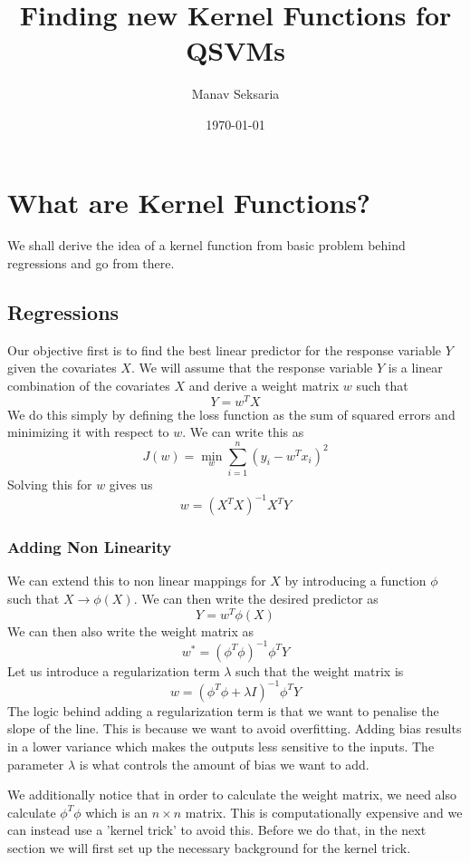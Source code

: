 \documentclass[hidelinks]{book}
\title{Finding new Kernel Functions for QSVMs}
\author{Manav Seksaria}
\date{\today}
\numberwithin{equation}{section}
\begin{document}
\maketitle

\section{What are Kernel Functions?}
We shall derive the idea of a kernel function from basic problem behind regressions and go from there.

\subsection{Regressions}
Our objective first is to find the best linear predictor for the response
variable $Y$ given the covariates $X$. We will assume that the response
variable $Y$ is a linear combination of the covariates $X$ and derive a
weight matrix $w$ such that
$$ Y = w^T X $$ We do this simply by defining the loss function as the sum of
squared errors and minimizing it with respect to $w$. We can write this as
$$ J(w) = \min_w \sum_{i=1}^n (y_i - w^T x_i)^2 $$ Solving this for $w$
gives us
$$ w = (X^T X)^{-1} X^T Y $$

\subsubsection{Adding Non Linearity}
We can extend this to non linear mappings for $X$ by introducing a function $\phi$ such that $X \rightarrow \phi(X)$. We can then write the desired predictor as
$$ Y = w^T \phi(X) $$ We can then also write the weight matrix as
$$ w^* = (\phi^T \phi)^{-1} \phi^T Y $$ Let us introduce a regularization term $\lambda$ such that the weight matrix is
$$ w = (\phi^T \phi + \lambda I)^{-1} \phi^T Y $$ The logic behind adding a regularization term is that we want to penalise the slope of the line. This is because we want to avoid overfitting. Adding bias results in a lower variance which makes the outputs less sensitive to the inputs. The parameter $\lambda$ is what controls the amount of bias we want to add.

We additionally notice that in order to calculate the weight matrix, we need also calculate $\phi^T \phi$ which is an $n \times n$ matrix. This is computationally expensive and we can instead use a 'kernel trick' to avoid this. Before we do that, in the next section we will first set up the necessary background for the kernel trick.
\end{document}
